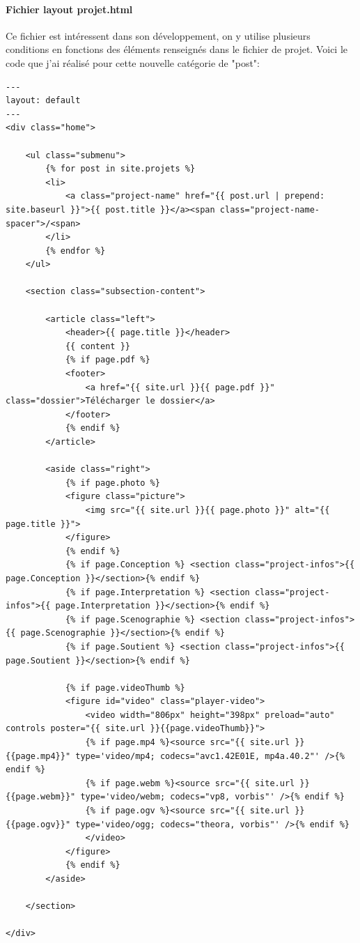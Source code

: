 \documentclass[11pt,a4paper]{report}
\begin{document}
			\paragraph{Fichier layout projet.html}Ce fichier est intéressent dans son développement, on y utilise plusieurs conditions en fonctions des éléments renseignés dans le fichier de projet. Voici le code que j'ai réalisé pour cette nouvelle catégorie de "post":
				\lstset{caption=Fichier "projet.html"}
				\begin{lstlisting}
---
layout: default
---
<div class="home">

	<ul class="submenu">
 		{% for post in site.projets %}
		<li>
			<a class="project-name" href="{{ post.url | prepend: site.baseurl }}">{{ post.title }}</a><span class="project-name-spacer">/<span>
		</li>
		{% endfor %}
	</ul>
	
	<section class="subsection-content">
	
		<article class="left">
			<header>{{ page.title }}</header>
			{{ content }}
			{% if page.pdf %}
			<footer>
				<a href="{{ site.url }}{{ page.pdf }}" class="dossier">Télécharger le dossier</a>
			</footer>
			{% endif %}
		</article>
		
		<aside class="right">
			{% if page.photo %}
			<figure class="picture">
				<img src="{{ site.url }}{{ page.photo }}" alt="{{ page.title }}">
			</figure>
			{% endif %}
			{% if page.Conception %} <section class="project-infos">{{ page.Conception }}</section>{% endif %}
			{% if page.Interpretation %} <section class="project-infos">{{ page.Interpretation }}</section>{% endif %}
			{% if page.Scenographie %} <section class="project-infos">{{ page.Scenographie }}</section>{% endif %}
			{% if page.Soutient %} <section class="project-infos">{{ page.Soutient }}</section>{% endif %}
			
			{% if page.videoThumb %}
			<figure id="video" class="player-video">
				<video width="806px" height="398px" preload="auto" controls poster="{{ site.url }}{{page.videoThumb}}">
				{% if page.mp4 %}<source src="{{ site.url }}{{page.mp4}}" type='video/mp4; codecs="avc1.42E01E, mp4a.40.2"' />{% endif %}
				{% if page.webm %}<source src="{{ site.url }}{{page.webm}}" type='video/webm; codecs="vp8, vorbis"' />{% endif %}
				{% if page.ogv %}<source src="{{ site.url }}{{page.ogv}}" type='video/ogg; codecs="theora, vorbis"' />{% endif %}
				</video>
			</figure>
			{% endif %}
		</aside>
	
	</section>
	
</div>

				\end{lstlisting}
\end{document}
